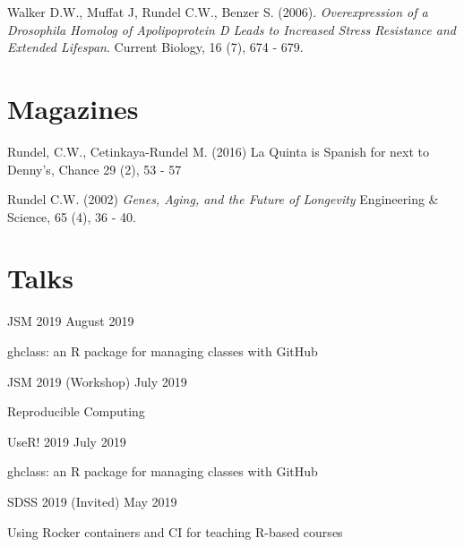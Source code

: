 \documentclass[margin,line]{res}
\begin{document}
\begin{resume}
\vspace{-0.15cm}
Walker D.W., Muffat J, Rundel C.W., Benzer S. (2006). {\em Overexpression of a Drosophila Homolog of Apolipoprotein D Leads to Increased Stress Resistance and Extended Lifespan}. Current Biology, 16 (7), 674 - 679.


\vspace{4mm}

%

\section{\sc Magazines}

Rundel, C.W., Cetinkaya-Rundel M. (2016) La Quinta is Spanish for next to Denny's, Chance 29 (2), 53 - 57


Rundel C.W. (2002) {\em Genes, Aging, and the Future of Longevity} Engineering \& Science, 65 (4), 36 - 40.

\vspace{4mm}

%

\section{\sc Talks}

JSM 2019 \hfill August 2019
\begin{list1}
\item[] ghclass: an R package for managing classes with GitHub
\end{list1}
\vspace{-3mm}

JSM 2019 (Workshop) \hfill July 2019
\begin{list1}
\item[] Reproducible Computing
\end{list1}
\vspace{-3mm}


UseR! 2019 \hfill July 2019
\begin{list1}
\item[] ghclass: an R package for managing classes with GitHub
\end{list1}
\vspace{-3mm}

SDSS 2019 (Invited) \hfill May 2019
\begin{list1}
\item[] Using Rocker containers and CI for teaching R-based courses
\end{list1}
\vspace{-3mm}


\end{resume}
\end{document}
